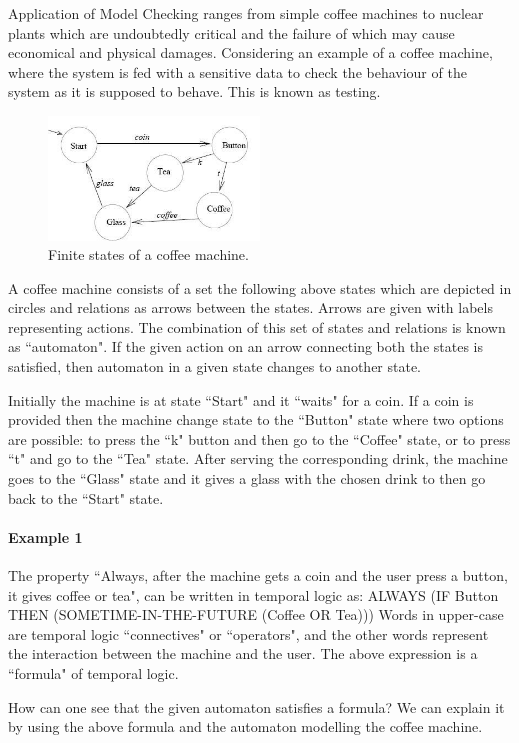 \documentclass[a4paper,10pt]{report}
\begin{document}
Application of Model Checking ranges from simple coffee machines to nuclear plants which are undoubtedly critical and the failure of which may cause economical and physical damages. Considering an example of a coffee machine, where the system is fed with a sensitive data to check the behaviour of the system as it is supposed to behave. This is known as testing. 
\begin{figure}[h!]
\centering
  \includegraphics[width= 0.5\textwidth]{flower.png}
\caption{Finite states of a coffee machine.}
\end{figure}
 A coffee machine consists of a set the following above states which are depicted in circles and relations as arrows between the states. Arrows are given with labels representing actions. The combination of this set of states and relations is known as ``automaton". If the given action on an arrow connecting both the states is satisfied, then automaton in a given state changes to another state. 
 
Initially the machine is at state ``Start" and it ``waits" for a coin. If a coin is provided then the machine change state to the ``Button" state where two options are possible: to press the ``k" button and then go to the ``Coffee" state, or to press ``t" and go to the ``Tea" state. After serving the corresponding drink, the machine goes to the ``Glass" state and it gives a glass with the chosen drink to then go back to the ``Start" state.
\paragraph{Example 1}
The property ``Always, after the machine gets a coin and the user press a button, it gives coffee or tea", can be written in temporal logic as:
ALWAYS (IF Button THEN (SOMETIME-IN-THE-FUTURE (Coffee OR Tea)))
Words in upper-case are temporal logic ``connectives" or ``operators", and the other words represent the interaction between the machine and the user. The above expression is a ``formula" of temporal logic.

How can one see that the given automaton satisfies a formula? We can explain it by using the above formula and the automaton modelling the coffee machine.
\end{document}

